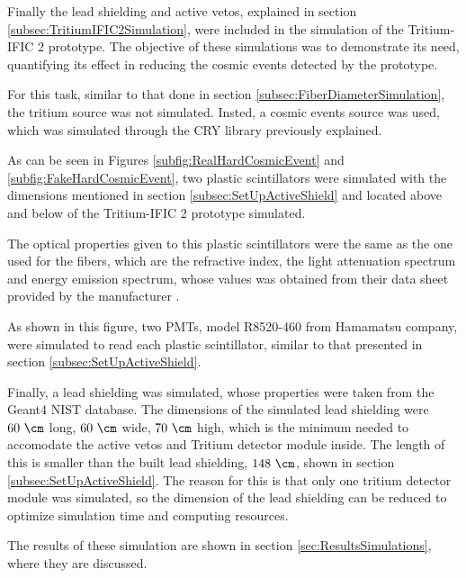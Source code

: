 Finally the lead shielding and active vetos, explained in section \ref{subsec:TritiumIFIC2Simulation}, were included in the simulation of the Tritium-IFIC 2 prototype. The objective of these simulations was to demonstrate its need, quantifying its effect in reducing the cosmic events detected by the prototype.

For this task, similar to that done in section \ref{subsec:FiberDiameterSimulation}, the tritium source was not simulated. Insted, a cosmic events source was used, which was simulated through the CRY library previously explained.

As can be seen in Figures \ref{subfig:RealHardCosmicEvent} and \ref{subfig:FakeHardCosmicEvent}, two plastic scintillators were simulated with the dimensions mentioned in section \ref{subsec:SetUpActiveShield} and located above and below of the Tritium-IFIC 2 prototype simulated. 

The optical properties given to this plastic scintillators were the same as the one used for the fibers, which are the refractive index, the light attenuation spectrum and energy emission spectrum, whose values was obtained from their data sheet provided by the manufacturer \cite{ScintillatorVeto}.

As shown in this figure, two PMTs, model R8520-460 from Hamamatsu company, were simulated to read each plastic scintillator, similar to that presented in section \ref{subsec:SetUpActiveShield}.

Finally, a lead shielding was simulated, whose properties were taken from the Geant4 NIST database. The dimensions of the simulated lead shielding were $60~\cm$ long, $60~\cm$ wide, $70~\cm$ high, which is the minimum needed to accomodate the active vetos and Tritium detector module inside.  The length of this is smaller than the built lead shielding, $148~\cm$, shown in section \ref{subsec:SetUpActiveShield}. The reason for this is that only one tritium detector module was simulated, so the dimension of the lead shielding can be reduced to optimize simulation time and computing resources.

The results of these simulation are shown in section \ref{sec:ResultsSimulations}, where they are discussed.
